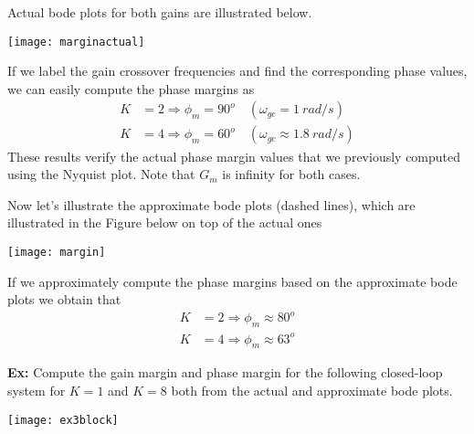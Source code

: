 \documentclass[twoside]{article}
\begin{document}
Actual bode plots for both gains are illustrated
below. 

\begin{center}
\begin{minipage}[h]{\linewidth}
    \begin{center}
      \texttt{[image: marginactual]}
    \end{center}
\end{minipage}
\end{center}

If we label the gain crossover frequencies and find the 
corresponding phase values, we can easily compute the phase 
margins as
%
\begin{align*}
  K &= 2 \Rightarrow \phi_m = 90^o \quad (\omega_{gc} = 1 \ rad/s)
  \\
  K &= 4 \Rightarrow \phi_m = 60^o \quad (\omega_{gc} \approx 1.8 \ rad/s)
\end{align*}
%
These results verify the actual phase margin values that we previously computed
using the Nyquist plot. Note that $G_m$ is infinity for both cases.

Now let's illustrate the approximate bode plots (dashed lines),
which are illustrated in the Figure below on top of the actual ones

\begin{center}
\begin{minipage}[h]{\linewidth}
    \begin{center}
      \texttt{[image: margin]}
    \end{center}
\end{minipage}
\end{center}

If we approximately compute the phase margins based
on the approximate bode plots we obtain that 
%
\begin{align*}
  K &= 2 \Rightarrow \phi_m \approx 80^o 
  \\
  K &= 4 \Rightarrow \phi_m \approx 63^o 
\end{align*}

\vspace{12pt}

\textbf{Ex:} Compute the gain margin and phase margin 
for the following closed-loop system for $K = 1$ and $K = 8$
both from the actual and approximate bode plots. 

\begin{center}
\begin{minipage}[h]{\linewidth}
    \begin{center}
      \texttt{[image: ex3block]}
    \end{center}
\end{minipage}
\end{center}
\end{document}
